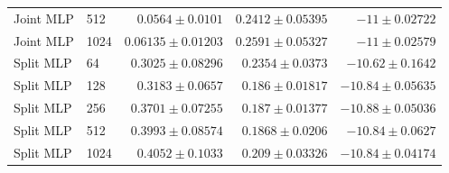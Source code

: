 \begin{longtable}{llrrr}
Joint MLP & 512 & $0.0564\pm 0.0101$ & $0.2412\pm 0.05395$ & $-11\pm 0.02722$\\
Joint MLP & 1024 & $0.06135\pm 0.01203$ & $0.2591\pm 0.05327$ & $-11\pm 0.02579$\\
Split MLP & 64 & $0.3025\pm 0.08296$ & $0.2354\pm 0.0373$ & $-10.62\pm 0.1642$\\
Split MLP & 128 & $0.3183\pm 0.0657$ & $0.186\pm 0.01817$ & $-10.84\pm 0.05635$\\
Split MLP & 256 & $0.3701\pm 0.07255$ & $0.187\pm 0.01377$ & $-10.88\pm 0.05036$\\
Split MLP & 512 & $0.3993\pm 0.08574$ & $0.1868\pm 0.0206$ & $-10.84\pm 0.0627$\\
Split MLP & 1024 & $0.4052\pm 0.1033$ & $0.209\pm 0.03326$ & $-10.84\pm 0.04174$\\
\bottomrule\end{longtable}
